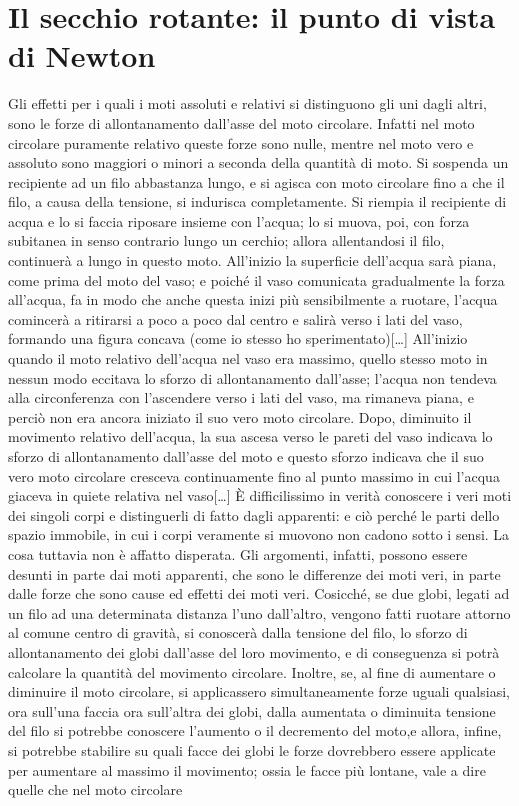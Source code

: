 \documentclass[a4paper,10pt,oneside]{article}
\begin{document}
\thispagestyle{empty}
 \section*{Il secchio rotante: il punto di vista di Newton}

\vspace{1cm}

Gli effetti per i quali i moti assoluti e relativi si distinguono gli uni dagli altri, sono le forze di allontanamento dall'asse del moto circolare. Infatti nel moto circolare puramente relativo queste forze sono nulle, mentre nel moto vero e assoluto sono maggiori o minori a seconda della quantità di moto. Si sospenda un recipiente ad un filo abbastanza lungo, e si agisca con moto circolare fino a che il filo, a causa della tensione, si indurisca completamente. Si riempia il recipiente di acqua e lo si faccia riposare insieme con l'acqua; lo si muova, poi, con forza subitanea in senso contrario lungo un cerchio; allora allentandosi il filo, continuerà a lungo in questo moto. All'inizio la superficie dell'acqua sarà piana, come prima del moto del vaso; e poiché il vaso comunicata gradualmente la forza all'acqua, fa in modo che anche questa inizi più sensibilmente a ruotare, l'acqua comincerà a ritirarsi a poco a poco dal centro e salirà verso i lati del vaso, formando una figura concava (come io stesso ho sperimentato)[\ldots] All'inizio quando il moto relativo dell'acqua nel vaso era massimo, quello stesso moto in nessun modo eccitava lo sforzo di allontanamento dall'asse; l'acqua non tendeva alla circonferenza con l'ascendere verso i lati del vaso, ma rimaneva piana, e perciò non era ancora iniziato il suo vero moto circolare. Dopo, diminuito il movimento relativo dell'acqua, la sua ascesa verso le pareti del vaso indicava lo sforzo di allontanamento  dall'asse del moto e questo sforzo indicava che il suo vero moto circolare cresceva continuamente fino al punto massimo in cui l'acqua giaceva in quiete relativa nel vaso[\ldots] È difficilissimo in verità conoscere i veri moti dei singoli corpi e distinguerli di fatto dagli apparenti: e ciò perché le parti dello spazio immobile, in cui i corpi veramente si muovono non cadono sotto i sensi. La cosa tuttavia non è affatto disperata. Gli argomenti, infatti, possono essere desunti in parte dai moti apparenti, che sono le differenze dei moti veri, in parte dalle forze che sono cause ed effetti dei moti veri. Cosicché, se due globi, legati ad un filo ad una determinata distanza l'uno dall'altro, vengono fatti ruotare attorno al comune centro di gravità, si conoscerà dalla tensione del filo, lo sforzo di allontanamento dei globi dall'asse del loro movimento, e di conseguenza si potrà calcolare la quantità del movimento circolare. Inoltre, se, al fine di aumentare o diminuire il moto circolare, si applicassero simultaneamente forze uguali qualsiasi, ora sull'una faccia ora sull'altra dei globi, dalla aumentata o diminuita tensione del filo si potrebbe conoscere l'aumento o il decremento del moto,e allora, infine, si potrebbe stabilire su quali facce dei globi le forze dovrebbero essere applicate per aumentare al massimo il movimento; ossia le facce più lontane, vale a dire quelle che nel moto circolare 
\end{document}
